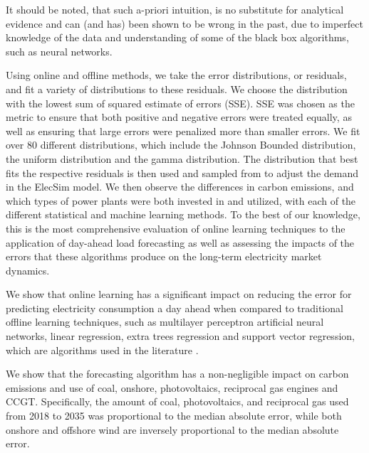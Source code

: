 \documentclass[final,3p,times,twocolumn,numbers]{elsarticle}
\begin{document}
It should be noted, that such a-priori intuition, is no substitute for analytical evidence and can (and has) been shown to be wrong in the past, due to imperfect knowledge of the data and understanding of some of the black box algorithms, such as neural networks.



Using online and offline methods, we take the error distributions, or residuals, and fit a variety of distributions to these residuals. We choose the distribution with the lowest sum of squared estimate of errors (SSE). SSE was chosen as the metric to ensure that both positive and negative errors were treated equally, as well as ensuring that large errors were penalized more than smaller errors. We fit over 80 different distributions, which include the Johnson Bounded distribution, the uniform distribution and the gamma distribution. The distribution that best fits the respective residuals is then used and sampled from to adjust the demand in the ElecSim model. We then observe the differences in carbon emissions, and which types of power plants were both invested in and utilized, with each of the different statistical and machine learning methods. To the best of our knowledge, this is the most comprehensive evaluation of online learning techniques to the application of day-ahead load forecasting as well as assessing the impacts of the errors that these algorithms produce on the long-term electricity market dynamics.





We show that online learning has a significant impact on reducing the error for predicting electricity consumption a day ahead when compared to traditional offline learning techniques, such as multilayer perceptron artificial neural networks, linear regression, extra trees regression and support vector regression, which are algorithms used in the literature \cite{Lu1993, Ahmad2017, Chen2004}. %

We show that the forecasting algorithm has a non-negligible impact on carbon emissions and use of coal, onshore, photovoltaics, reciprocal gas engines and CCGT. Specifically, the amount of coal, photovoltaics, and reciprocal gas used from 2018 to 2035 was proportional to the median absolute error, while both onshore and offshore wind are inversely proportional to the median absolute error.
\end{document}
